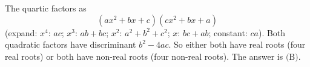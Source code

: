 The quartic factors as
\[\left(ax^2+bx+c\right)\left(cx^2+bx+a\right)\]
(expand: $x^4$: $ac$; $x^3$: $ab+bc$; $x^2$: $a^2+b^2+c^2$; $x$: $bc+ab$; constant: $ca$). Both quadratic factors have discriminant $b^2-4ac$. So either both have real roots (four real roots) or both have non-real roots (four non-real roots). The answer is $\boxed{\text{(B)}}$.
